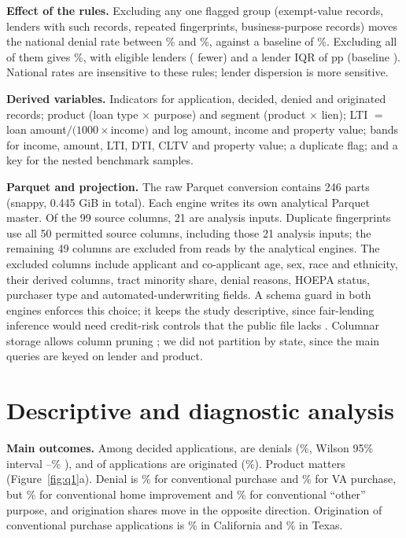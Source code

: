 \documentclass[acmtog,nonacm]{acmart}
\begin{document}
\textbf{Effect of the rules.} Excluding any one flagged group (exempt-value records, lenders with such records, repeated fingerprints, business-purpose records) moves the national denial rate between \RobMin\% and \RobMax\%, against a baseline of \DenialPct\%. Excluding all of them gives \RobComb\%, with \RobCombEl{} eligible lenders (\RobCombLost{} fewer) and a lender IQR of \RobCombIQR{} pp (baseline \RawIQR{}). National rates are insensitive to these rules; lender dispersion is more sensitive.

\textbf{Derived variables.} Indicators for application, decided, denied and originated records; product (loan type $\times$ purpose) and segment (product $\times$ lien); LTI $=$ loan amount$/(1000\times$income$)$ and log amount, income and property value; bands for income, amount, LTI, DTI, CLTV and property value; a duplicate flag; and a key for the nested benchmark samples.

\textbf{Parquet and projection.} The raw Parquet conversion contains 246 parts (snappy, 0.445 GiB in total). Each engine writes its own analytical Parquet master. Of the 99 source columns, 21 are analysis inputs. Duplicate fingerprints use all 50 permitted source columns, including those 21 analysis inputs; the remaining 49 columns are excluded from reads by the analytical engines. The excluded columns include applicant and co-applicant age, sex, race and ethnicity, their derived columns, tract minority share, denial reasons, HOEPA status, purchaser type and automated-underwriting fields. A schema guard in both engines enforces this choice; it keeps the study descriptive, since fair-lending inference would need credit-risk controls that the public file lacks \cite{ffiec2019}. Columnar storage allows column pruning \cite{parquet}; we did not partition by state, since the main queries are keyed on lender and product.

\section{Descriptive and diagnostic analysis}
\textbf{Main outcomes.} Among \NDecided{} decided applications, \NDenied{} are denials (\DenialPct\%, Wilson 95\% interval \DenialLo--\DenialHi\% \cite{wilson1927}), and \NOrig{} of \NApps{} applications are originated (\OrigPct\%). Product matters (Figure~\ref{fig:q1}a). Denial is \ConvPurchDen\% for conventional purchase and \VAPurchDen\% for VA purchase, but \ConvImprDen\% for conventional home improvement and \ConvOtherDen\% for conventional ``other'' purpose, and origination shares move in the opposite direction. Origination of conventional purchase applications is \CAOrig\% in California and \TXOrig\% in Texas.
\end{document}
